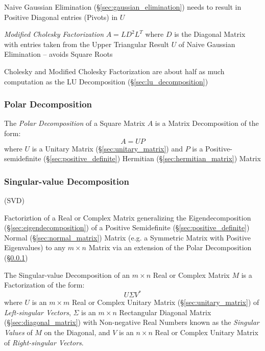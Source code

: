 Naive Gaussian Elimination (\S\ref{sec:gaussian_elimination}) needs to result
in Positive Diagonal entries (Pivots) in $U$

\emph{Modified Cholesky Factorization} $A = L D^2 L^T$ where $D$ is the
Diagonal Matrix with entries taken from the Upper Triangular Result $U$ of
Naive Gaussian Elimination -- avoids Square Roots

Cholesky and Modified Cholesky Factorization are about half as much computation
as the LU Decomposition (\S\ref{sec:lu_decomposition})



\subsubsection{Polar Decomposition}\label{sec:polar_decomposition}

The \emph{Polar Decomposition} of a Square Matrix $A$ is a Matrix Decomposition
of the form:
\[
  A = U P
\]
where $U$ is a Unitary Matrix (\S\ref{sec:unitary_matrix}) and $P$ is a
Positive-semidefinite (\S\ref{sec:positive_definite}) Hermitian
(\S\ref{sec:hermitian_matrix}) Matrix



\subsubsection{Singular-value Decomposition}\label{sec:svd}

(SVD)

Factoriztion of a Real or Complex Matrix generalizing the Eigendecomposition
(\S\ref{sec:eigendecomposition}) of a Positive Semidefinite
(\S\ref{sec:positive_definite}) Normal (\S\ref{sec:normal_matrix}) Matrix (e.g.
a Symmetric Matrix with Positive Eigenvalues) to any $m \times n$ Matrix via an
extension of the Polar Decomposition (\S\ref{sec:polar_decomposition})

The Singular-value Decomposition of an $m \times n$ Real or Complex Matrix $M$
is a Factorization of the form:
\[
  U \Sigma V^*
\]
where $U$ is an $m \times m$ Real or Complex Unitary Matrix
(\S\ref{sec:unitary_matrix}) of \emph{Left-singular Vectors}, $\Sigma$ is an $m
\times n$ Rectangular Diagonal Matrix (\S\ref{sec:diagonal_matrix}) with
Non-negative Real Numbers known as the \emph{Singular Values} of $M$ on the
Diagonal, and $V$ is an $n \times n$ Real or Complex Unitary Matrix of
\emph{Right-singular Vectors}.



